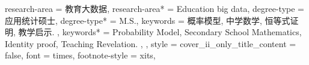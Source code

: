 {{      %
    research-area = {教育大数据},
    research-area* = {Education big data},
    degree-type = {应用统计硕士},
    degree-type* = {M.S.},
    keywords = {
      概率模型, 中学数学, 恒等式证明, 教学启示.
    },
    keywords* = {
      Probability Model, Secondary School Mathematics, Identity proof, Teaching Revelation.
    },
  },
  style = {
    cover_ii_only_title_content = false,
    font = times,
    footnote-style = xits,
}}
